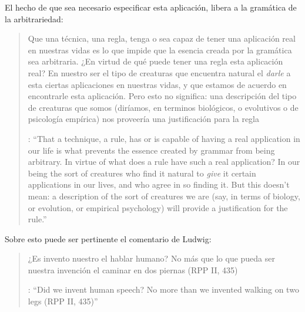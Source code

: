 El hecho de que sea necesario especificar esta aplicación, libera a la gramática de la arbitrariedad: \blockquote[{\cite[220]{teichmann2008ans}}: \enquote{That a technique, a rule, has or is capable of having a real application in our life is what prevents the essence created by grammar from being arbitrary. In virtue of what does a rule have such a real application? In our being the sort of creatures who find it natural to \emph{give} it certain applications in our lives, and who agree in so finding it. But this doesn't mean: a description of the sort of creatures we are (say, in terms of biology, or evolution, or empirical psychology) will provide a justification for the rule.}]{Que una técnica, una regla, tenga o sea capaz de tener una aplicación real en nuestras vidas es lo que impide que la esencia creada por la gramática sea arbitraria. ¿En virtud de qué puede tener una regla esta aplicación real? En nuestro ser el tipo de creaturas que encuentra natural el \emph{darle} a esta ciertas aplicaciones en nuestras vidas, y que estamos de acuerdo en encontrarle esta aplicación. Pero esto no significa: una descripción del tipo de creaturas que somos (diríamos, en terminos biológicos, o evolutivos o de psicología empírica) nos proveería una justificación para la regla}. Sobre esto puede ser pertinente el comentario de Ludwig: \blockquote[{\cite[114]{kerr1997theo}}: \enquote{Did we invent human speech? No more than we invented walking on two legs (RPP II, 435)}]{¿Es invento nuestro el hablar humano? No más que lo que pueda ser nuestra invención el caminar en dos piernas (RPP II, 435)}.

